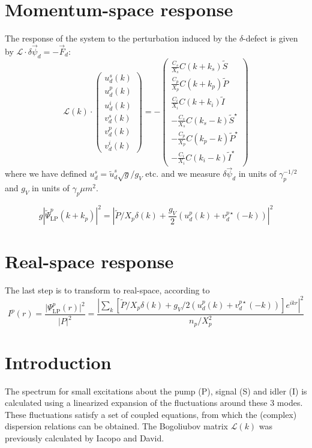 \documentclass[a4paper,prb,10pt,aps,twocolumn]{revtex4-1}
\begin{document}
\section{Momentum-space response}

The response of the system to the perturbation induced by the
$\delta$-defect is given by
$\mathcal{L} \cdot \delta\vec{\psi}_{d}=-\vec{F}_{d}$:\[\mathcal{L}(k) \cdot \left(\begin{array}{c}
u^s_d(k)\\
u^p_d(k)\\
u^i_d(k)\\
v^s_d(k)\\
v^p_d(k)\\
v^i_d(k)
\end{array}\right)=
-\left(\begin{array}{c}
\frac{C_{s}}{X_s}C(k+k_{s})\tilde{S}\\
\frac{C_{p}}{X_p}C(k+k_{p})\tilde{P}\\
\frac{C_{i}}{X_i}C(k+k_{i})\tilde{I}\\
-\frac{C_{s}}{X_s}C(k_{s}-k)\tilde{S}^{\star}\\
-\frac{C_{p}}{X_p}C(k_{p}-k)\tilde{P}^{\star}\\
-\frac{C_{i}}{X_i}C(k_{i}-k)\tilde{I}^{\star}
\end{array}\right)\]where we have defined $u_d^s = \tilde{u}_d^s \sqrt{g}/g_V$ etc. and we
measure $\delta\vec{\psi}_{d}$ in units of $\gamma_p^{-1/2}$ and $g_V$
in units of $\gamma_p \mu m^2$.

\[g \left|\tilde{\Psi}_{\text{LP}}^{p}\left(k+k_{p}\right)\right|^{2}= \left|\tilde{P}/X_{p}\delta(k)+\frac{g_{V}}{2}\left(u_{d}^{p}(k)+v_{d}^{p\star}(-k)\right)\right|^{2}\]

\section{Real-space response}

The last step is to transform to real-space, according to\[I^{p}(r)=\frac{\vert\Psi_{\text{LP}}^{p}(r)\vert^{2}}{\vert P\vert^{2}}=\frac{\left|\sum_{k}\left[\tilde{P}/X_{p}\delta(k)+g_V/2\left(u_{d}^{p}(k)+v_{d}^{p\star}(-k)\right)\right]e^{ikr}\right|^{2}}{n_p/X_p^2}\]

\section{Introduction}
\label{sec:intro}

The spectrum for small excitations about the pump (P), signal (S) and idler (I)
 is calculated using a linearized expansion of the fluctuations around these 3 
modes. These fluctuations satisfy a set of coupled equations, from which the 
(complex) dispersion relations can be obtained. The Bogoliubov matrix 
$\mathcal{L}(k)$ was previously calculated by Iacopo and David.
\end{document}
